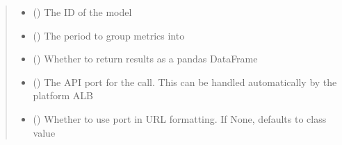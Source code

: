 \documentclass[letterpaper,10pt,english]{sphinxmanual}
\begin{document}
\begin{fulllineitems}
\begin{fulllineitems}
\begin{sphinxVerbatim}[commandchars=\\\{\}]
 
  
\end{sphinxVerbatim}
\begin{quote}\begin{description}
\begin{itemize}
\item {} 
\sphinxAtStartPar
{} () \textendash{} The ID of the model

\item {} 
\sphinxAtStartPar
{} (\sphinxstyleliteralemphasis{\sphinxupquote{ (}}\sphinxstyleliteralemphasis{\sphinxupquote{)}}) \textendash{} The period to group metrics into

\item {} 
\sphinxAtStartPar
{} (\sphinxstyleliteralemphasis{\sphinxupquote{ (}}\sphinxstyleliteralemphasis{\sphinxupquote{)}}) \textendash{} Whether to return results as a pandas DataFrame

\item {} 
\sphinxAtStartPar
{} (\sphinxstyleliteralemphasis{\sphinxupquote{ (}}\sphinxstyleliteralemphasis{\sphinxupquote{)}}) \textendash{} The API port for the call. This can be handled automatically by the platform ALB

\item {} 
\sphinxAtStartPar
{} (\sphinxstyleliteralemphasis{\sphinxupquote{ (}}\sphinxstyleliteralemphasis{\sphinxupquote{)}}) \textendash{} Whether to use port in URL formatting. If None, defaults to class value


\end{itemize}
\end{description}
\end{quote}
\end{fulllineitems}
\end{fulllineitems}
\end{document}
